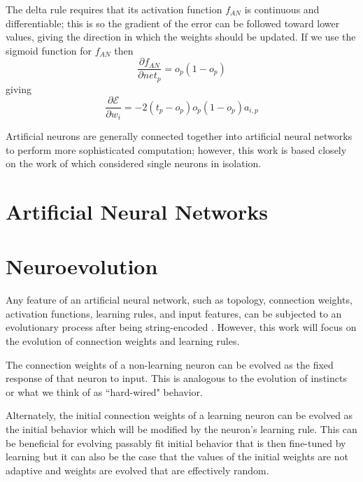 \documentclass[master]{outhesis}
\begin{document}
The delta rule requires that its activation function $f_{AN}$ is continuous and differentiable;
this is so the gradient of the error can be followed toward lower values, giving the direction in which the weights should be updated.
If we use the sigmoid function for $f_{AN}$ then
\begin{displaymath}
\frac{\partial f_{AN}}{\partial net_p} = o_p(1 - o_p)
\end{displaymath}
giving
\begin{displaymath}
\frac{\partial \mathcal{E}}{\partial w_i} = -2(t_p - o_p)o_p(1 - o_p)a_{i,p}
\end{displaymath}

Artificial neurons are generally connected together into artificial neural networks to perform more sophisticated computation;
however, this work is based closely on the work of \citet{Chalmers:1990aa} which considered single neurons in isolation.

\section{Artificial Neural Networks}

\section{Neuroevolution}

Any feature of an artificial neural network, such as topology, connection weights, activation functions, learning rules, and input features, can be subjected to an evolutionary process after being string-encoded \citep{Yao:1999lp}.
However, this work will focus on the evolution of connection weights and learning rules.

The connection weights of a non-learning neuron can be evolved as the fixed response of that neuron to input.
This is analogous to the evolution of instincts or what we think of as ``hard-wired" behavior.

Alternately, the initial connection weights of a learning neuron can be evolved as the initial behavior which will be modified by the neuron's learning rule.
This can be beneficial for evolving passably fit initial behavior that is then fine-tuned by learning
but it can also be the case that the values of the initial weights are not adaptive and weights are evolved that are effectively random.
\end{document}

